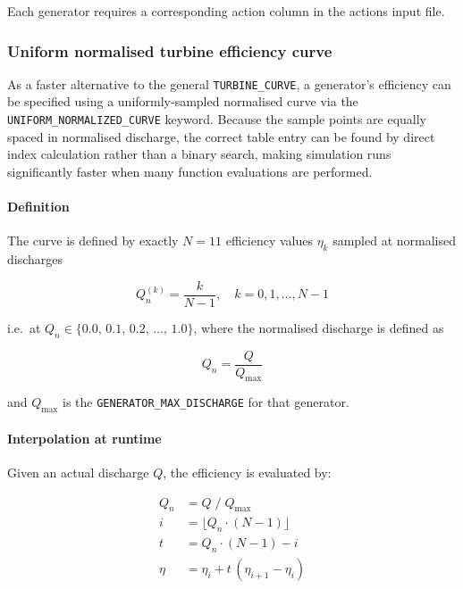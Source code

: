 \documentclass[a4paper, 12pt]{report}
\begin{document}
	Each generator requires a corresponding action column in the actions input file. \newline
	
	
	\subsubsection{Uniform normalised turbine efficiency curve}
	
	As a faster alternative to the general \texttt{TURBINE\_CURVE}, a generator's efficiency can be specified using a uniformly-sampled normalised curve via the \texttt{UNIFORM\_NORMALIZED\_CURVE} keyword. Because the sample points are equally spaced in normalised discharge, the correct table entry can be found by direct index calculation rather than a binary search, making simulation runs significantly faster when many function evaluations are performed.
	
	\paragraph{Definition}
	
	The curve is defined by exactly $N = 11$ efficiency values $\eta_k$ sampled at normalised discharges
	
	\begin{equation}
		Q_n^{(k)} = \frac{k}{N-1}, \quad k = 0, 1, \ldots, N-1
	\end{equation}
	
	\noindent i.e.\ at $Q_n \in \{0.0,\, 0.1,\, 0.2,\, \ldots,\, 1.0\}$, where the normalised discharge is defined as
	
	\begin{equation}
		Q_n = \frac{Q}{Q_\text{max}}
	\end{equation}
	
	\noindent and $Q_\text{max}$ is the \texttt{GENERATOR\_MAX\_DISCHARGE} for that generator.
	
	\paragraph{Interpolation at runtime}
	
	Given an actual discharge $Q$, the efficiency is evaluated by:
	
	\begin{align}
		Q_n &= Q \;/\; Q_\text{max} \\
		i   &= \lfloor Q_n \cdot (N-1) \rfloor \\
		t   &= Q_n \cdot (N-1) - i \\
		\eta &= \eta_i + t\,(\eta_{i+1} - \eta_i)
	\end{align}
	
\end{document}
